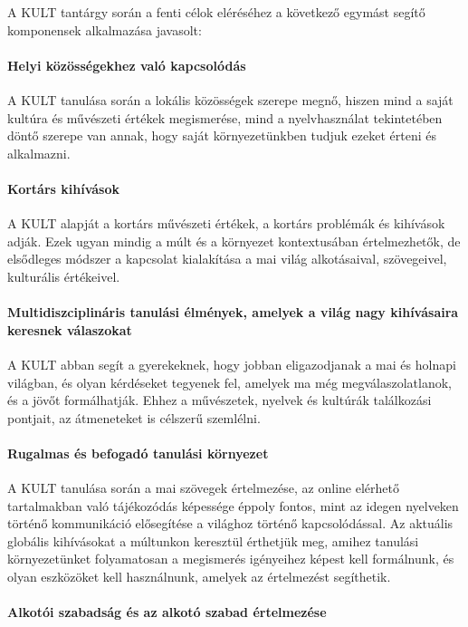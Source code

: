 A KULT tantárgy során a fenti célok eléréséhez a következő egymást segítő
komponensek alkalmazása javasolt:

\paragraph{Helyi közösségekhez való kapcsolódás}

A KULT tanulása során a lokális közösségek szerepe megnő, hiszen mind a saját
kultúra és művészeti értékek megismerése, mind a nyelvhasználat tekintetében
döntő szerepe van annak, hogy saját környezetünkben  tudjuk ezeket érteni és
alkalmazni.

\paragraph{Kortárs kihívások}

A KULT alapját a kortárs művészeti értékek, a kortárs problémák és kihívások
adják. Ezek ugyan mindig a múlt és a környezet kontextusában értelmezhetők, de
elsődleges módszer a kapcsolat kialakítása a mai világ alkotásaival,
szövegeivel, kulturális értékeivel.

\paragraph{Multidiszciplináris tanulási élmények, amelyek a világ nagy
  kihívásaira keresnek válaszokat}

A KULT abban segít a gyerekeknek, hogy jobban eligazodjanak a mai és holnapi
világban, és olyan kérdéseket tegyenek fel, amelyek ma még megválaszolatlanok, és
a jövőt formálhatják. Ehhez a művészetek, nyelvek és kultúrák találkozási
pontjait, az átmeneteket is célszerű szemlélni.

\paragraph{Rugalmas és befogadó tanulási környezet}

A KULT tanulása során a mai szövegek értelmezése, az online elérhető
tartalmakban való tájékozódás képessége éppoly fontos, mint az idegen nyelveken
történő kommunikáció elősegítése a világhoz történő kapcsolódással. Az aktuális
globális kihívásokat a múltunkon keresztül érthetjük meg, amihez tanulási
környezetünket folyamatosan a megismerés igényeihez képest kell formálnunk, és
olyan eszközöket kell használnunk, amelyek az értelmezést segíthetik.

\paragraph{Alkotói szabadság és az alkotó szabad értelmezése}

